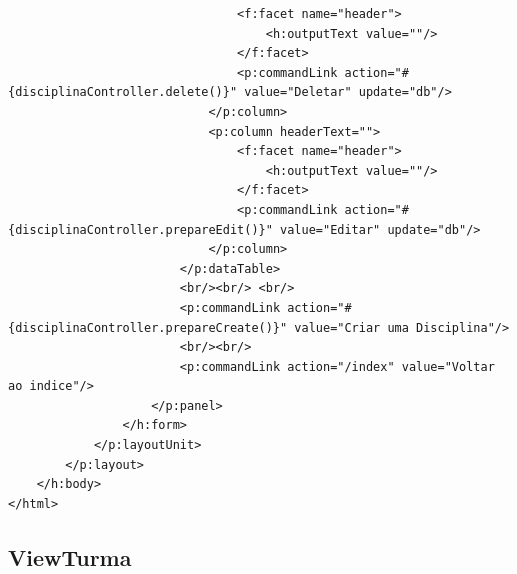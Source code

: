 \documentclass[12pt,a4paper]{article}
\begin{document}
\begin{lstlisting}
                                <f:facet name="header">
                                    <h:outputText value=""/>
                                </f:facet>
                                <p:commandLink action="#{disciplinaController.delete()}" value="Deletar" update="db"/>
                            </p:column>
                            <p:column headerText="">
                                <f:facet name="header">
                                    <h:outputText value=""/>
                                </f:facet>
                                <p:commandLink action="#{disciplinaController.prepareEdit()}" value="Editar" update="db"/>
                            </p:column>            
                        </p:dataTable> 
                        <br/><br/> <br/>
                        <p:commandLink action="#{disciplinaController.prepareCreate()}" value="Criar uma Disciplina"/>
                        <br/><br/>
                        <p:commandLink action="/index" value="Voltar ao indice"/>
                    </p:panel>
                </h:form>
            </p:layoutUnit>
        </p:layout>
    </h:body>
</html>
\end{lstlisting}


\subsection{ViewTurma}
\end{document}
